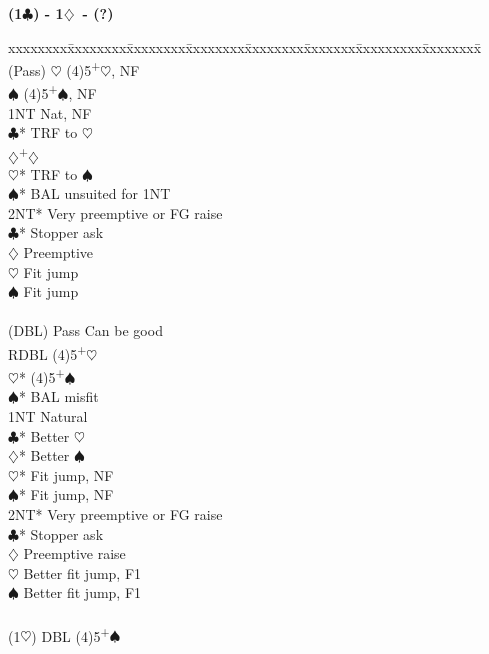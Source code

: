\documentclass[10pt]{article}
\renewcommand{\c}{$\clubsuit$}
\renewcommand{\d}{$\diamondsuit$}
\newcommand{\h}{$\heartsuit$}
\newcommand{\s}{$\spadesuit$}
\newcommand{\p}{\textsuperscript{+}}
\newcommand{\x}{DBL}
\newcommand{\xx}{RDBL}
\newenvironment{bidtable}[1][]
{\textbf{#1}
  \begin{adjustwidth}{1em}{}
    \addvspace{2pt}
    \begin{tabbing}
      xxxxxxxx\=xxxxxxxx\=xxxxxxxx\=xxxxxxxx\=xxxxxxxx\=xxxxxxx\=xxxxxxxxx\=xxxxxxxx\=\kill}
{\end{tabbing}\end{adjustwidth}\bigskip}%
\begin{document}
\begin{bidtable}[(1\c) - 1\d\ - (?)]
(Pass) \h  \> (4)5\p\h, NF                \\
       \s  \> (4)5\p\s, NF                \\
       \> 1NT  \> Nat, NF                     \\
       \c* \> TRF to \h                   \\
       \d  {}\p\d                       \\
       \h* \> TRF to \s                   \\
       \s* \> BAL unsuited for 1NT        \\
       \> 2NT* \> Very preemptive or FG raise \\
       \c* \> Stopper ask                 \\
       \d  \> Preemptive                  \\
       \h  \> Fit jump                    \\
       \s  \> Fit jump                    \\
                                              \\
(\x)   \> Pass \> Can be good                 \\
       \> \xx  \> (4)5\p\h                    \\
       \h* \> (4)5\p\s                    \\
       \s* \> BAL misfit                  \\
       \> 1NT  \> Natural                     \\
       \c* \> Better \h                   \\
       \d* \> Better \s                   \\
       \h* \> Fit jump, NF                \\
       \s* \> Fit jump, NF                \\
       \> 2NT* \> Very preemptive or FG raise \\
       \c* \> Stopper ask                 \\
       \d  \> Preemptive raise            \\
       \h  \> Better fit jump, F1         \\
       \s  \> Better fit jump, F1         \\
                                              \\
(1\h)  \> \x   \> (4)5\p\s                    \\

\end{bidtable}
\end{document}
